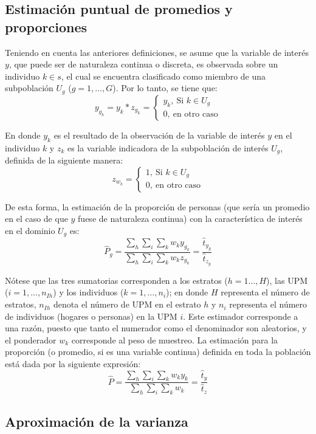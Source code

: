 \documentclass[
  12pt,
  spanish,
]{book}
\begin{document}
\hypertarget{estimaciuxf3n-puntual-de-promedios-y-proporciones}{%
\subsection{Estimación puntual de promedios y proporciones}\label{estimaciuxf3n-puntual-de-promedios-y-proporciones}}

Teniendo en cuenta las anteriores definiciones, se asume que la variable de interés \(y\), que puede ser de naturaleza continua o discreta, es observada sobre un individuo \(k\in s\), el cual se encuentra clasificado como miembro de una subpoblación \(U_g\) (\(g=1, \ldots, G\)). Por lo tanto, se tiene que:
\[ 
y_{g_k}=y_k*z_{g_k}=
\begin{cases}
y_k, \ \text{Si $k \in U_g$} \\
0, \ \text{en otro caso}
\end{cases}
\]

En donde \(y_k\) es el resultado de la observación de la variable de interés \(y\) en el individuo \(k\) y \(z_k\) es la variable indicadora de la subpoblación de interés \(U_g\), definida de la siguiente manera:
\[ 
z_{w_k}=
\begin{cases}
1, \ \text{Si $k\in U_g$ } \\
0, \ \text{en otro caso}
\end{cases}
\]

De esta forma, la estimación de la proporción de personas (que sería un promedio en el caso de que \(y\) fuese de naturaleza continua) con la característica de interés en el dominio \(U_g\) es:
\[
\hat P_g = \frac{\sum_h\sum_i\sum_k w_ky_{g_k}}{\sum_h\sum_i\sum_k w_kz_{g_k}}
=
\frac{\hat t_{y_g}}{\hat t_{z_g}}
\]

Nótese que las tres sumatorias corresponden a los estratos (\(h=1\ldots, H\)), las UPM (\(i= 1, \ldots, n_{Ih}\)) y los individuos (\(k= 1, \ldots, n_i\)); en donde \(H\) representa el número de estratos, \(n_{Ih}\) denota el número de UPM en el estrato \(h\) y \(n_i\) representa el número de individuos (hogares o personas) en la UPM \(i\). Este estimador corresponde a una razón, puesto que tanto el numerador como el denominador son aleatorios, y el ponderador \(w_k\) corresponde al peso de muestreo. La estimación para la proporción (o promedio, si es una variable continua) definida en toda la población está dada por la siguiente expresión:
\[ 
\hat P =\frac{\sum_h\sum_i\sum_k w_ky_{k}}{\sum_h\sum_i\sum_k w_k} =
\frac{\hat t_{y}}{\hat t_{z}}
\]

\hypertarget{aproximaciuxf3n-de-la-varianza}{%
\subsection{Aproximación de la varianza}\label{aproximaciuxf3n-de-la-varianza}}
\end{document}
